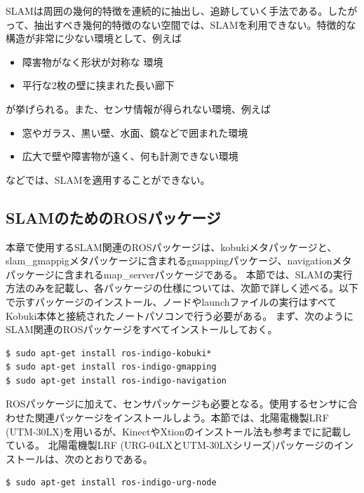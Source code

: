 SLAMは周囲の幾何的特徴を連続的に抽出し、追跡していく手法である。したがって、抽出すべき幾何的特徴のない空間では、SLAMを利用できない。特徴的な構造が非常に少ない環境として、例えば

\begin{itemize}
\item  障害物がなく形状が対称な  環境
\item 平行な2枚の壁に挟まれた長い廊下
\end{itemize}

が挙げられる。また、センサ情報が得られない環境、例えば

\begin{itemize}
\item 窓やガラス、黒い壁、水面、鏡などで囲まれた環境
\item 広大で壁や障害物が遠く、何も計測できない環境
\end{itemize}

などでは、SLAMを適用することができない。

\subsection{SLAMのためのROSパッケージ}

本章で使用するSLAM関連のROSパッケージは、kobukiメタパッケージと、slam\_gmappigメタパッケージに含まれるgmappingパッケージ、navigationメタパッケージに含まれるmap\_serverパッケージである。 本節では、SLAMの実行方法のみを記載し、各パッケージの仕様については、次節で詳しく述べる。以下で示すパッケージのインストール、ノードやlaunchファイルの実行はすべてKobuki本体と接続されたノートパソコンで行う必要がある。
まず、次のようにSLAM関連のROSパッケージをすべてインストールしておく。

\begin{lstlisting}[language=ROS]
$ sudo apt-get install ros-indigo-kobuki*
$ sudo apt-get install ros-indigo-gmapping
$ sudo apt-get install ros-indigo-navigation
\end{lstlisting}

ROSパッケージに加えて、センサパッケージも必要となる。使用するセンサに合わせた関連パッケージをインストールしよう。本節では、北陽電機製LRF (UTM-30LX)を用いるが、KinectやXtionのインストール法も参考までに記載している。
北陽電機製LRF (URG-04LXとUTM-30LXシリーズ)パッケージのインストールは、次のとおりである。

\begin{lstlisting}[language=ROS]
$ sudo apt-get install ros-indigo-urg-node
\end{lstlisting}

